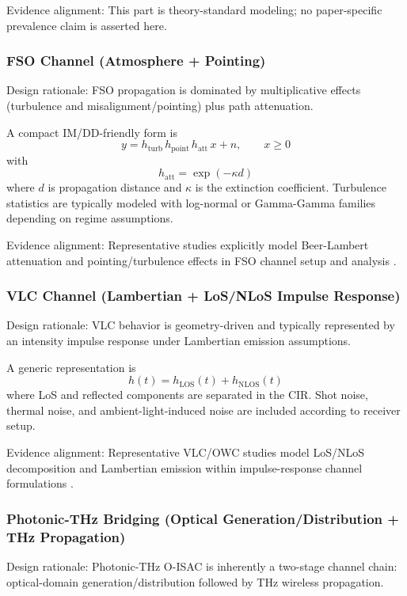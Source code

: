 \documentclass[letterpaper,journal]{IEEEtran}
\begin{document}
Evidence alignment: This part is theory-standard modeling; no paper-specific prevalence claim is asserted here.

\subsubsection{FSO Channel (Atmosphere + Pointing)}
Design rationale: FSO propagation is dominated by multiplicative effects (turbulence and misalignment/pointing) plus path attenuation.

A compact IM/DD-friendly form is
\begin{equation}
    y = h_{\text{turb}}\,h_{\text{point}}\,h_{\text{att}}\,x + n,\qquad x\ge 0
\end{equation}
with
\begin{equation}
    h_{\text{att}}=\exp(-\kappa d)
\end{equation}
where \(d\) is propagation distance and \(\kappa\) is the extinction coefficient. Turbulence statistics are typically modeled with log-normal or Gamma-Gamma families depending on regime assumptions.

Evidence alignment: Representative studies explicitly model Beer-Lambert attenuation and pointing/turbulence effects in FSO channel setup and analysis \cite{O_ISAC_035,O_ISAC_005}.

\subsubsection{VLC Channel (Lambertian + LoS/NLoS Impulse Response)}
Design rationale: VLC behavior is geometry-driven and typically represented by an intensity impulse response under Lambertian emission assumptions.

A generic representation is
\begin{equation}
    h(t)=h_{\text{LOS}}(t)+h_{\text{NLOS}}(t)
\end{equation}
where LoS and reflected components are separated in the CIR. Shot noise, thermal noise, and ambient-light-induced noise are included according to receiver setup.

Evidence alignment: Representative VLC/OWC studies model LoS/NLoS decomposition and Lambertian emission within impulse-response channel formulations \cite{O_ISAC_039,O_ISAC_022}.

\subsubsection{Photonic-THz Bridging (Optical Generation/Distribution + THz Propagation)}
Design rationale: Photonic-THz O-ISAC is inherently a two-stage channel chain: optical-domain generation/distribution followed by THz wireless propagation.
\end{document}
